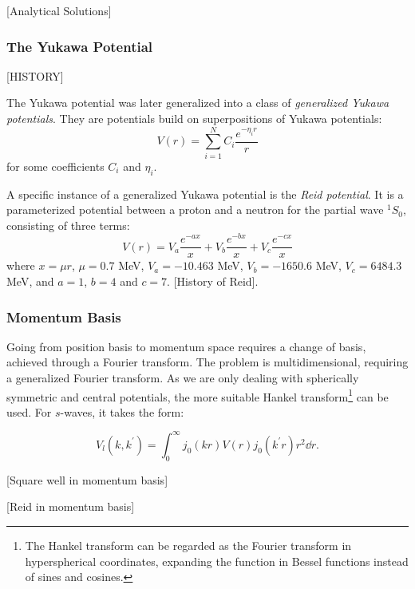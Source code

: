 [Analytical Solutions]


\subsubsection{The Yukawa Potential}
[HISTORY]

The Yukawa potential was later generalized into a class of \textit{generalized
  Yukawa potentials}. They are potentials build on superpositions of Yukawa potentials:
\begin{equation*}
  V(r) = \sum_{i=1}^{N}C_{i}\frac{e^{-\eta_{i}r}}{r}
\end{equation*}
for some coefficients \(C_{i}\) and \(\eta_{i}\).

A specific instance of a generalized Yukawa potential is the \textit{Reid potential}. It
is a parameterized potential between a proton and a neutron for the partial wave
\(^{1}S_{0}\), consisting of three terms:
\begin{equation*}
  V(r) = V_{a}\frac{e^{-ax}}{x} + V_{b}\frac{e^{-bx}}{x} + V_{c}\frac{e^{-cx}}{x}
\end{equation*}
where \(x=\mu r\), \(\mu=0.7\) MeV, \(V_{a}=-10.463\) MeV, \(V_{b}=-1650.6\)
MeV, \(V_{c}=6484.3\) MeV, and \(a=1\), \(b=4\) and \(c=7\).
[History of Reid].

\subsubsection{Momentum Basis}

Going from position basis to momentum space requires a change of basis, achieved
through a Fourier transform. The problem is multidimensional, requiring a
generalized Fourier transform. As we are only dealing with spherically symmetric
and central potentials, the more suitable Hankel transform\footnote{The Hankel
  transform can be regarded as the Fourier transform in hyperspherical coordinates, expanding the function in
Bessel functions instead of sines and cosines. } can be used. For
\(s\)-waves, it takes the form:

\newcommand{\kp}{k^{\prime}}
\begin{equation*}
  V_{l}(k, \kp{}) = \int_{0}^{\infty}j_{0}(kr)V(r)j_{0}(k^{\prime}r)r^{2}\dd r .
\end{equation*}

[Square well in momentum basis]

[Reid in momentum basis]




